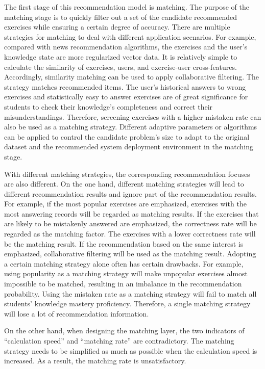 The first stage of this recommendation model is matching. The purpose of the matching stage is to quickly filter out a set of the candidate recommended exercises while ensuring a certain degree of accuracy. There are multiple strategies for matching to deal with different application scenarios. For example, compared with news recommendation algorithms, the exercises and the user's knowledge state are more regularized vector data. It is relatively simple to calculate the similarity of exercises, users, and exercise-user cross-features. Accordingly, similarity matching can be used to apply collaborative filtering. The strategy matches recommended items. The user's historical answers to wrong exercises and statistically easy to answer exercises are of great significance for students to check their knowledge's completeness and correct their misunderstandings. Therefore, screening exercises with a higher mistaken rate can also be used as a matching strategy. Different adaptive parameters or algorithms can be applied to control the candidate problem's size to adapt to the original dataset and the recommended system deployment environment in the matching stage.

With different matching strategies, the corresponding recommendation focuses are also different. On the one hand, different matching strategies will lead to different recommendation results and ignore part of the recommendation results. For example, if the most popular exercises are emphasized, exercises with the most answering records will be regarded as matching results. If the exercises that are likely to be mistakenly answered are emphasized, the correctness rate will be regarded as the matching factor. The exercises with a lower correctness rate will be the matching result. If the recommendation based on the same interest is emphasized, collaborative filtering will be used as the matching result. Adopting a certain matching strategy alone often has certain drawbacks. For example, using popularity as a matching strategy will make unpopular exercises almost impossible to be matched, resulting in an imbalance in the recommendation probability. Using the mistaken rate as a matching strategy will fail to match all students' knowledge mastery proficiency. Therefore, a single matching strategy will lose a lot of recommendation information.

On the other hand, when designing the matching layer, the two indicators of ``calculation speed'' and ``matching rate'' are contradictory. The matching strategy needs to be simplified as much as possible when the calculation speed is increased. As a result, the matching rate is unsatisfactory.

